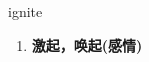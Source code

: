 
\begin{frame}
{\huge ignite}
\begin{center}
\begin{enumerate}\Large
  \item \textbf{激起，唤起(感情)}
\end{enumerate}
\end{center}
\end{frame}

